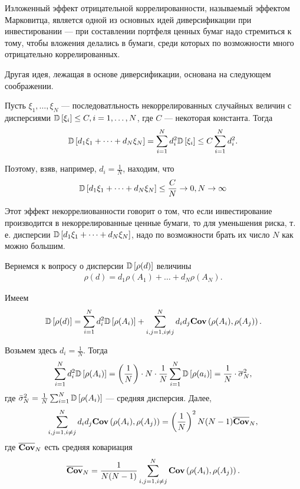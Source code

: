Изложенный эффект отрицательной коррелированности, называемый эффектом Марковитца, является одной из основных идей диверсификации при инвестировании ---
при составлении портфеля ценных бумаг надо стремиться к тому, чтобы вложения делались в бумаги, среди которых по возможности много отрицательно коррелированных.

Другая идея, лежащая в основе диверсификации, основана на следующем соображении.

Пусть $\xi_1, \dots, \xi_N$ --- последоватльность некоррелированных случайных величин с дисперсиями $\mathbb{D}\left[\xi_i\right] \le C, i=1, \dots, N$, 
где $C$ --- некоторая константа. Тогда
\begin{align}
\mathbb{D}\left[d_1 \xi_1 + \dots + d_N \xi_N\right] = \sum_{i=1}^{N} d_i^2 \mathbb{D}\left[\xi_i\right] \le C \sum_{i=1}^{N} d_i^2 .
\end{align}

Поэтому, взяв, например, $d_i = \frac{1}{N}$, находим, что
\begin{align}
\mathbb{D}\left[d_1 \xi_1 + \dots + d_N \xi_N\right] \le \frac{C}{N} \rightarrow 0, N \rightarrow \infty
\end{align}

Этот эффект некоррелиованности говорит о том, что если инвестирование производится в некоррелированные ценные бумаги, то для уменьшения риска,
т. е. дисперсии $\mathbb{D}\left[d_1 \xi_1 + \dots + d_N \xi_N\right]$, надо по возможности брать их число $N$ как можно большим.

Вернемся к вопросу о дисперсии $\mathbb{D}\left[\rho(d)\right]$ величины
\begin{align}
\rho(d) = d_1 \rho(A_1) + \dots + d_N \rho(A_N) .
\end{align}

Имеем
\begin{align}
\mathbb{D}\left[\rho(d)\right] = \sum_{i=1}^{N} d_i^2 \mathbb{D}\left[\rho(A_i)\right] + \sum_{i, j = 1, i \ne j}^{N} d_i d_j \textbf{Cov}\left(\rho(A_i), \rho(A_j)\right) .
\end{align}

Возьмем здесь $d_i = \frac{1}{N}$. Тогда
\begin{align}
\sum_{i=1}^{N} d_i^2 \mathbb{D}\left[\rho(A_i)\right] = 
	\left(\frac{1}{N}\right) \cdot N \cdot \frac{1}{N} \sum_{i=1}^{N} \mathbb{D}\left[\rho(a_i)\right] =
	\frac{1}{N} \cdot \overline{\sigma}_N^2 ,
\end{align}
где $\bar{\sigma}_N^2 = \frac{1}{N} \sum_{i=1}^{N} \mathbb{D}\left[\rho(A_i)\right]$ --- средняя дисперсия. Далее,
\begin{align}
\sum_{i, j = 1, i \ne j}^{N} d_i d_j \textbf{Cov}\left(\rho(A_i), \rho(A_j)\right) =
	\left(\frac{1}{N}\right)^2 N (N - 1) \overline{\textbf{Cov}}_N ,
\end{align}
где $\overline{\textbf{Cov}}_N$ есть средняя ковариация
\begin{align}
\overline{\textbf{Cov}}_N = \frac{1}{N (N - 1)} \sum_{i, j = 1, i \ne j}^{N} \textbf{Cov}\left(\rho(A_i), \rho(A_j)\right) .
\end{align}

